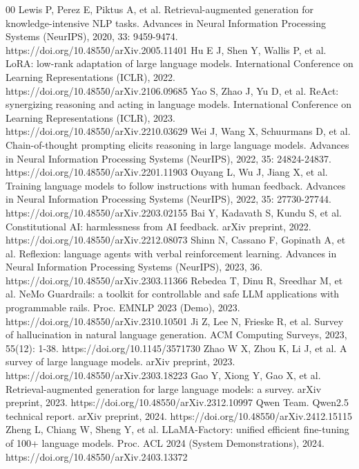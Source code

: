\documentclass[conference]{IEEEtran}
\begin{document}
\begin{thebibliography}{00}
 Lewis P, Perez E, Piktus A, et al. Retrieval-augmented generation for knowledge-intensive NLP tasks. Advances in Neural Information Processing Systems (NeurIPS), 2020, 33: 9459-9474. https://doi.org/10.48550/arXiv.2005.11401
 Hu E J, Shen Y, Wallis P, et al. LoRA: low-rank adaptation of large language models. International Conference on Learning Representations (ICLR), 2022. https://doi.org/10.48550/arXiv.2106.09685
 Yao S, Zhao J, Yu D, et al. ReAct: synergizing reasoning and acting in language models. International Conference on Learning Representations (ICLR), 2023. https://doi.org/10.48550/arXiv.2210.03629
 Wei J, Wang X, Schuurmans D, et al. Chain-of-thought prompting elicits reasoning in large language models. Advances in Neural Information Processing Systems (NeurIPS), 2022, 35: 24824-24837. https://doi.org/10.48550/arXiv.2201.11903
 Ouyang L, Wu J, Jiang X, et al. Training language models to follow instructions with human feedback. Advances in Neural Information Processing Systems (NeurIPS), 2022, 35: 27730-27744. https://doi.org/10.48550/arXiv.2203.02155
 Bai Y, Kadavath S, Kundu S, et al. Constitutional AI: harmlessness from AI feedback. arXiv preprint, 2022. https://doi.org/10.48550/arXiv.2212.08073
 Shinn N, Cassano F, Gopinath A, et al. Reflexion: language agents with verbal reinforcement learning. Advances in Neural Information Processing Systems (NeurIPS), 2023, 36. https://doi.org/10.48550/arXiv.2303.11366
 Rebedea T, Dinu R, Sreedhar M, et al. NeMo Guardrails: a toolkit for controllable and safe LLM applications with programmable rails. Proc. EMNLP 2023 (Demo), 2023. https://doi.org/10.48550/arXiv.2310.10501
 Ji Z, Lee N, Frieske R, et al. Survey of hallucination in natural language generation. ACM Computing Surveys, 2023, 55(12): 1-38. https://doi.org/10.1145/3571730
 Zhao W X, Zhou K, Li J, et al. A survey of large language models. arXiv preprint, 2023. https://doi.org/10.48550/arXiv.2303.18223
 Gao Y, Xiong Y, Gao X, et al. Retrieval-augmented generation for large language models: a survey. arXiv preprint, 2023. https://doi.org/10.48550/arXiv.2312.10997
 Qwen Team. Qwen2.5 technical report. arXiv preprint, 2024. https://doi.org/10.48550/arXiv.2412.15115
 Zheng L, Chiang W, Sheng Y, et al. LLaMA-Factory: unified efficient fine-tuning of 100+ language models. Proc. ACL 2024 (System Demonstrations), 2024. https://doi.org/10.48550/arXiv.2403.13372

\end{thebibliography}
\end{document}
